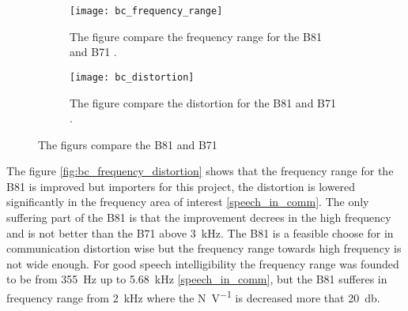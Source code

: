 \begin{figure}[H]
\centering
\begin{subfigure}[htbp]{0.48\textwidth}
		\texttt{[image: bc\_frequency\_range]}
		\caption{The figure compare the frequency range for the B81 and B71  \citep{the_balanced_2003}.}
		\label{fig:bc_frequency_range}
\end{subfigure}\hspace{10pt}
\begin{subfigure}[htbp]{0.48\textwidth}
		\texttt{[image: bc\_distortion]}
		\caption{The figure compare the distortion for the B81 and B71  \citep{the_balanced_2003}.}
		\label{fig:bc_distortion}
\end{subfigure} 
\caption{The figurs compare the  B81 and B71}
\label{fig:bc_frequency_distortion}
\end{figure}



The figure \autoref{fig:bc_frequency_distortion} shows that the frequency range for the B81 is improved but importers for this project, the distortion is lowered significantly in the frequency area of interest \autoref{speech_in_comm}. The only suffering part of the B81 is that the improvement decrees in the high frequency and is not better than the B71 above \SI{3}{\kilo\hertz}. The B81 is a feasible choose for  in communication distortion wise but the frequency range towards high frequency is not wide enough. For good speech intelligibility the frequency range was founded to be from \SI{355}{\hertz} up to \SI{5.68}{\kilo\hertz}  \autoref{speech_in_comm}, but the B81 sufferes in frequency range from \SI{2}{\kilo\hertz} where the \si{\newton\per\volt} is decreased more that \SI{20}{\decibel}.








